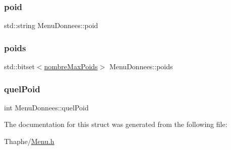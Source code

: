 \mbox{\label{struct_menu_donnees_ab6965a46bb5eb45820cb6148cfe1fc59}} 
\subsubsection{\texorpdfstring{poid}{poid}}
{\footnotesize\ttfamily std\+::string Menu\+Donnees\+::poid}

\mbox{\label{struct_menu_donnees_a4ed6d7392ed72cfdcf8efb68018b5873}} 
\subsubsection{\texorpdfstring{poids}{poids}}
{\footnotesize\ttfamily std\+::bitset$<$\mbox{\hyperlink{libraries_8h_ad73c201205ac3bfe4a118d327a7255ce}{nombre\+Max\+Poids}}$>$ Menu\+Donnees\+::poids}

\mbox{\label{struct_menu_donnees_aa2561120ada24f21a281f888005f086e}} 
\subsubsection{\texorpdfstring{quelPoid}{quelPoid}}
{\footnotesize\ttfamily int Menu\+Donnees\+::quel\+Poid}



The documentation for this struct was generated from the following file\+:\begin{DoxyCompactItemize}
\item 
Thaphe/\mbox{\hyperlink{_menu_8h}{Menu.\+h}}\end{DoxyCompactItemize}
